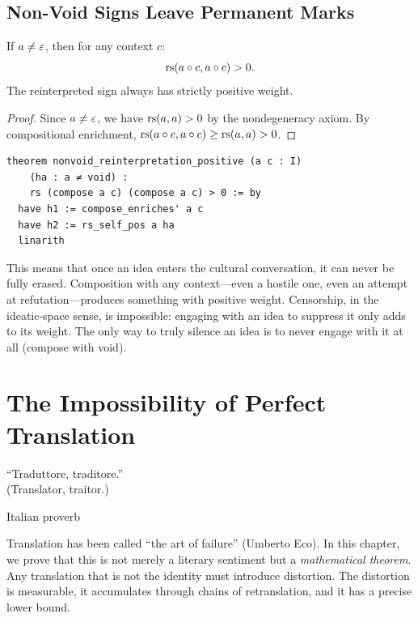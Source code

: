 \section{Non-Void Signs Leave Permanent Marks}

\begin{theorem}
\label{thm:reading-irreversible}
If $a \neq \varepsilon$, then for any context $c$:
\[
  \mathrm{rs}(a \circ c, a \circ c) > 0.
\]
The reinterpreted sign always has strictly positive weight.
\end{theorem}

\begin{proof}
Since $a \neq \varepsilon$, we have $\mathrm{rs}(a, a) > 0$ by the nondegeneracy axiom.
By compositional enrichment, $\mathrm{rs}(a \circ c, a \circ c) \geq \mathrm{rs}(a, a) > 0$.
\end{proof}

\begin{lstlisting}
theorem nonvoid_reinterpretation_positive (a c : I)
    (ha : a ≠ void) :
    rs (compose a c) (compose a c) > 0 := by
  have h1 := compose_enriches' a c
  have h2 := rs_self_pos a ha
  linarith
\end{lstlisting}

\begin{remark}
This means that once an idea enters the cultural conversation, it can
never be fully erased.  Composition with any context---even a hostile
one, even an attempt at refutation---produces something with positive
weight.  Censorship, in the ideatic-space sense, is impossible: engaging
with an idea to suppress it only adds to its weight.  The only way to
truly silence an idea is to never engage with it at all (compose with
void).
\end{remark}



\chapter{The Impossibility of Perfect Translation}
\label{ch:translation}

\epigraph{``Traduttore, traditore.''\\(Translator, traitor.)}{Italian proverb}

Translation has been called ``the art of failure'' (Umberto Eco).  In this
chapter, we prove that this is not merely a literary sentiment but a
\emph{mathematical theorem}.  Any translation that is not the identity
must introduce distortion.  The distortion is measurable, it accumulates
through chains of retranslation, and it has a precise lower bound.

